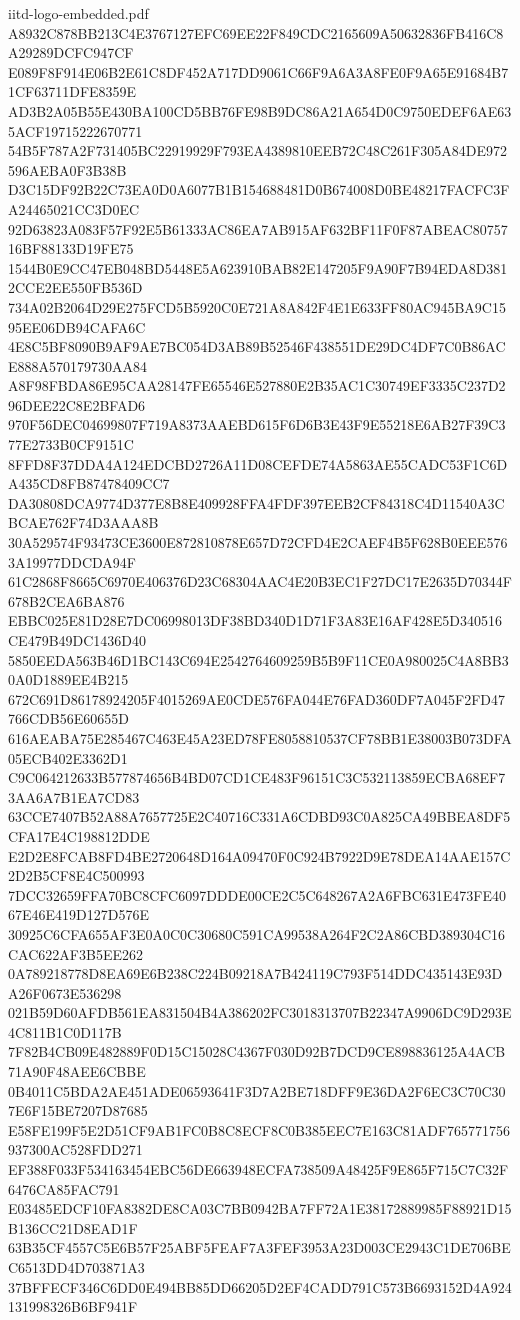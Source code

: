 \begin{filecontents*}[overwrite]{iitd-logo-embedded.pdf}
A8932C878BB213C4E3767127EFC69EE22F849CDC2165609A50632836FB416C8A29289DCFC947CF
E089F8F914E06B2E61C8DF452A717DD9061C66F9A6A3A8FE0F9A65E91684B71CF63711DFE8359E
AD3B2A05B55E430BA100CD5BB76FE98B9DC86A21A654D0C9750EDEF6AE635ACF19715222670771
54B5F787A2F731405BC22919929F793EA4389810EEB72C48C261F305A84DE972596AEBA0F3B38B
D3C15DF92B22C73EA0D0A6077B1B154688481D0B674008D0BE48217FACFC3FA24465021CC3D0EC
92D63823A083F57F92E5B61333AC86EA7AB915AF632BF11F0F87ABEAC8075716BF88133D19FE75
1544B0E9CC47EB048BD5448E5A623910BAB82E147205F9A90F7B94EDA8D3812CCE2EE550FB536D
734A02B2064D29E275FCD5B5920C0E721A8A842F4E1E633FF80AC945BA9C1595EE06DB94CAFA6C
4E8C5BF8090B9AF9AE7BC054D3AB89B52546F438551DE29DC4DF7C0B86ACE888A570179730AA84
A8F98FBDA86E95CAA28147FE65546E527880E2B35AC1C30749EF3335C237D296DEE22C8E2BFAD6
970F56DEC04699807F719A8373AAEBD615F6D6B3E43F9E55218E6AB27F39C377E2733B0CF9151C
8FFD8F37DDA4A124EDCBD2726A11D08CEFDE74A5863AE55CADC53F1C6DA435CD8FB87478409CC7
DA30808DCA9774D377E8B8E409928FFA4FDF397EEB2CF84318C4D11540A3CBCAE762F74D3AAA8B
30A529574F93473CE3600E872810878E657D72CFD4E2CAEF4B5F628B0EEE5763A19977DDCDA94F
61C2868F8665C6970E406376D23C68304AAC4E20B3EC1F27DC17E2635D70344F678B2CEA6BA876
EBBC025E81D28E7DC06998013DF38BD340D1D71F3A83E16AF428E5D340516CE479B49DC1436D40
5850EEDA563B46D1BC143C694E2542764609259B5B9F11CE0A980025C4A8BB30A0D1889EE4B215
672C691D86178924205F4015269AE0CDE576FA044E76FAD360DF7A045F2FD47766CDB56E60655D
616AEABA75E285467C463E45A23ED78FE8058810537CF78BB1E38003B073DFA05ECB402E3362D1
C9C064212633B577874656B4BD07CD1CE483F96151C3C532113859ECBA68EF73AA6A7B1EA7CD83
63CCE7407B52A88A7657725E2C40716C331A6CDBD93C0A825CA49BBEA8DF5CFA17E4C198812DDE
E2D2E8FCAB8FD4BE2720648D164A09470F0C924B7922D9E78DEA14AAE157C2D2B5CF8E4C500993
7DCC32659FFA70BC8CFC6097DDDE00CE2C5C648267A2A6FBC631E473FE4067E46E419D127D576E
30925C6CFA655AF3E0A0C0C30680C591CA99538A264F2C2A86CBD389304C16CAC622AF3B5EE262
0A789218778D8EA69E6B238C224B09218A7B424119C793F514DDC435143E93DA26F0673E536298
021B59D60AFDB561EA831504B4A386202FC3018313707B22347A9906DC9D293E4C811B1C0D117B
7F82B4CB09E482889F0D15C15028C4367F030D92B7DCD9CE898836125A4ACB71A90F48AEE6CBBE
0B4011C5BDA2AE451ADE06593641F3D7A2BE718DFF9E36DA2F6EC3C70C307E6F15BE7207D87685
E58FE199F5E2D51CF9AB1FC0B8C8ECF8C0B385EEC7E163C81ADF765771756937300AC528FDD271
EF388F033F534163454EBC56DE663948ECFA738509A48425F9E865F715C7C32F6476CA85FAC791
E03485EDCF10FA8382DE8CA03C7BB0942BA7FF72A1E38172889985F88921D15B136CC21D8EAD1F
63B35CF4557C5E6B57F25ABF5FEAF7A3FEF3953A23D003CE2943C1DE706BEC6513DD4D703871A3
37BFFECF346C6DD0E494BB85DD66205D2EF4CADD791C573B6693152D4A924131998326B6BF941F

\end{filecontents*}

